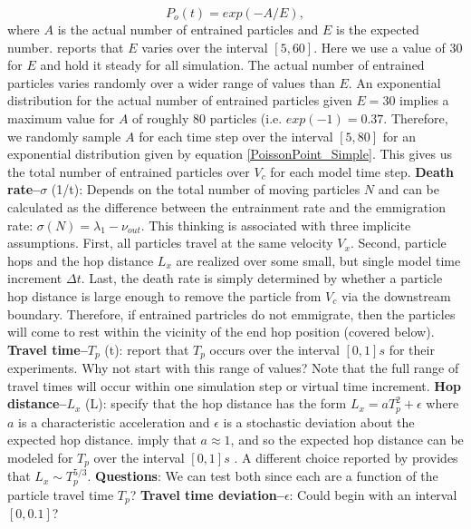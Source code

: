 \documentclass[12pt]{article}
\begin{document}
\begin{outline}[enumerate]
\begin{equation}
	P_o(t)=exp(-A/E),
	\label{PoissonPoint_Simple}
\end{equation}
where $A$ is the actual number of entrained particles and $E$ is the expected number. \citet{Ancey2010JGR} reports that $E$ varies over the interval $[5,60]$. Here we use a value of 30 for $E$ and hold it steady for all simulation. The actual number of entrained particles varies randomly over a wider range of values than $E$. An exponential distribution for the actual number of entrained particles given $E=30$ implies a maximum value for $A$ of roughly 80 particles (i.e. $exp(-1)=0.37$. Therefore, we randomly sample $A$ for each time step over the interval $[5,80]$ for an exponential distribution given by equation \ref{PoissonPoint_Simple}. This gives us the total number of entrained particles over $V_c$ for each model time step.
%
\1 \textbf{Death rate--$\sigma$} (1/t): Depends on the total number of moving particles $N$ and can be calculated as the difference between the entrainment rate and the emmigration rate: $\sigma(N)=\lambda_1-\nu_{out}$. This thinking is associated with three implicite assumptions. First, all particles travel at the same velocity $V_x$. Second, particle hops and the hop distance $L_x$ are realized over some small, but single model time increment $\Delta t$. Last, the death rate is simply determined by whether a particle hop distance is large enough to remove the particle from $V_c$ via the downstream boundary. Therefore, if entrained partricles do not emmigrate, then the particles will come to rest within the vicinity of the end hop position (covered below).
%
\1 \textbf{Travel time--$T_p$} (t): \citep{Furbish2012a,Fathel2015,Furbish2017b} report that $T_p$ occurs over the interval $[0,1]s$ for their experiments. Why not start with this range of values? Note that the full range of travel times will occur within one simulation step or virtual time increment.
%
\1 \textbf{Hop distance--$L_x$} (L): \citet{Furbish2017b} specify that the hop distance has the form $L_x=aT_p^2+\epsilon$ where $a$ is a characteristic acceleration and $\epsilon$ is a stochastic deviation about the expected hop distance. \citet{Fathel2015} imply that $a\approx 1$, and so the expected hop distance can be modeled for $T_p$ over the interval $[0,1]s$ \citep{Furbish2012a,Fathel2015,Furbish2017b}. A different choice reported by \citet{Furbish2012a} provides that $L_x\sim T_p^{5/3}$. 
	\2 \textbf{Questions}: We can test both since each are a function of the particle travel time $T_p$?
%
\1 \textbf{Travel time deviation--$\epsilon$}: Could begin with an interval $[0,0.1]$?

\end{outline}
\end{document}

